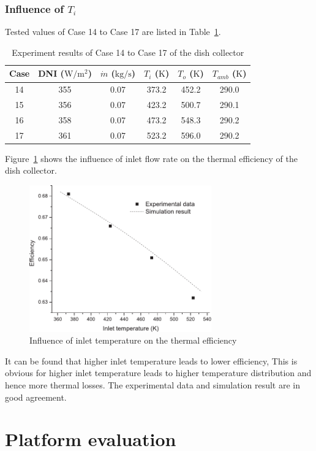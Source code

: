 \subsubsection{Influence of $T_i$}

Tested values of Case 14 to Case 17 are listed in Table~\ref{tab:ResultOfDish3}.

\begin{table}[htbp]\footnotesize
	\caption{Experiment results of Case 14 to Case 17 of the dish collector}
	\begin{center}
	\begin{tabular}{cccccc}
		\toprule
		Case	& DNI ($\mathrm{W/m^2}$)	&	$\dot{m}$ ($\mathrm{kg/s}$)			&	$T_i$ ($\mathrm{K}$)	&	$T_o$ ($\mathrm{K}$)		&	$T_{amb}$ ($\mathrm{K}$)\\
		\midrule
		14	&	355	&	0.07	&	373.2	&	452.2	&	290.0\\
		15	&	356	&	0.07	&	423.2	&	500.7	&	290.1\\
		16	&	358	&	0.07	&	473.2	&	548.3	&	290.2	\\
		17	&	361	&	0.07	&	523.2	&	596.0	&	290.2\\
		\bottomrule
	\end{tabular}
	\end{center}
	\label{tab:ResultOfDish3}
\end{table}

Figure~\ref{fig:T_i-eta} shows the influence of inlet flow rate on the thermal efficiency of the dish collector.
\begin{figure}[!ht]
\centering
\includegraphics[width=0.7\textwidth]{fig/T_i-eta}
\caption{Influence of inlet temperature on the thermal efficiency}
\label{fig:T_i-eta}
\end{figure}

It can be found that higher inlet temperature leads to lower efficiency, This is obvious for higher inlet temperature leads to higher temperature distribution and hence more thermal losses. The experimental data and simulation result are in good agreement.

\section{Platform evaluation}